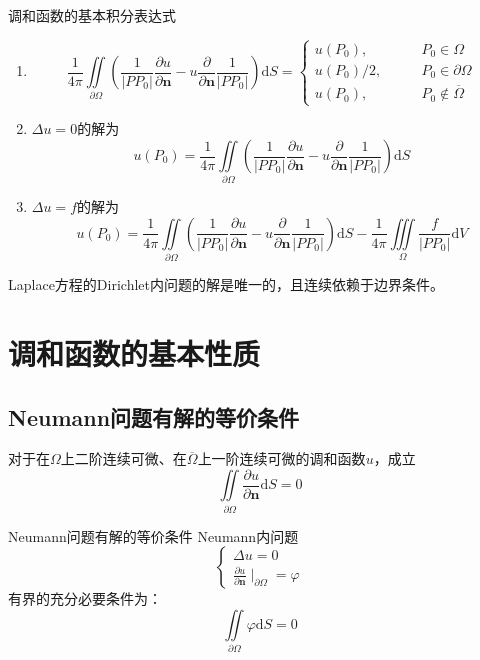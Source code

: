 \documentclass[lang = cn, scheme = chinese, thmcnt = section]{elegantbook}
\newcommand{\bs}{\boldsymbol}          %
\newcommand{\dd}{\mathrm{d}}           %
\newcommand{\IInt}{\iint\limits}
\newcommand{\IIInt}{\iiint\limits}
\begin{document}
\begin{theorem}{调和函数的基本积分表达式}
	\begin{enumerate}
		\item 
		$$
		\frac{1}{4\pi}\IInt_{\partial\Omega}\left(\frac{1}{|PP_0|}\frac{\partial u}{\partial \bs{n}}-u\frac{\partial }{\partial\bs{n}}\frac{1}{|PP_0|}\right)\dd S=\begin{cases}
			u(P_0),\qquad & P_0\in\Omega\\
			u(P_0)/2,\qquad & P_0\in\partial\Omega\\
			u(P_0),\qquad & P_0\notin\overline{\Omega}
		\end{cases}
		$$
		\item $\Delta u=0$的解为
		$$
		u(P_0)=\frac{1}{4\pi}\IInt_{\partial\Omega}\left(\frac{1}{|PP_0|}\frac{\partial u}{\partial \bs{n}}-u\frac{\partial }{\partial\bs{n}}\frac{1}{|PP_0|}\right)\dd S
		$$
		\item $\Delta u=f$的解为
		$$
		u(P_0)=\frac{1}{4\pi}\IInt_{\partial\Omega}\left(\frac{1}{|PP_0|}\frac{\partial u}{\partial \bs{n}}-u\frac{\partial }{\partial\bs{n}}\frac{1}{|PP_0|}\right)\dd S-\frac{1}{4\pi}\IIInt_{\Omega}\frac{f}{|PP_0|}\dd V
		$$
	\end{enumerate}
\end{theorem}

\begin{theorem}
	Laplace方程的Dirichlet内问题的解是唯一的，且连续依赖于边界条件。
\end{theorem}

\section{调和函数的基本性质}

\subsection{Neumann问题有解的等价条件}

\begin{lemma}
	对于在$\Omega$上二阶连续可微、在$\overline{\Omega}$上一阶连续可微的调和函数$u$，成立%
	$$
	\IInt_{\partial\Omega}\frac{\partial u}{\partial \bs{n}}\dd S=0
	$$
\end{lemma}

\begin{theorem}{Neumann问题有解的等价条件}
	Neumann内问题
	$$
	\begin{cases}
		\Delta u=0\\
		\frac{\partial u}{\partial\bs{n}}\mid_{\partial \Omega}=\varphi
	\end{cases}
	$$
	有界的充分必要条件为：%
	$$
	\IInt_{\partial\Omega}\varphi\dd S=0
	$$
\end{theorem}
\end{document}
